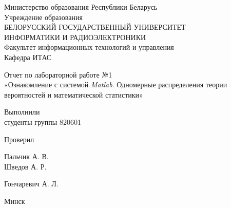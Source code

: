 \begin{titlepage}
\thispagestyle{empty}
\setlength{\parindent}{0ex} %

\begin{center}
  Министерство образования Республики Беларусь \\
  \vspace{0.5ex}
  Учреждение образования \\
  БЕЛОРУССКИЙ ГОСУДАРСТВЕННЫЙ УНИВЕРСИТЕТ \\
  ИНФОРМАТИКИ И РАДИОЭЛЕКТРОНИКИ \\
  \vspace{0.5ex}
  Факультет информационных технологий и управления \\
  \vspace{0.5ex}
  Кафедра ИТАС
\end{center}

\vspace{50mm}

\begin{center}
  Отчет по лабораторной работе №1 \\
  «Ознакомление с системой \textit{Matlab}. Одномерные распределения теории вероятностей и математической статистики»
\end{center}

\vspace{50mm}

\begin{minipage}{.55\linewidth}
    Выполнили \\
    студенты группы 820601

    \smallskip

    Проверил
\end{minipage}
\hfill
\begin{minipage}{.4\linewidth}
    \begin{flushright}
        Пальчик А. В.\\
        Шведов А. Р.

        \smallskip

        Гончаревич А. Л.
    \end{flushright}
\end{minipage}

\vfill
\begin{center}
  Минск \the\year{}
\end{center}

\setlength{\parindent}{1.25cm} %
\end{titlepage}
